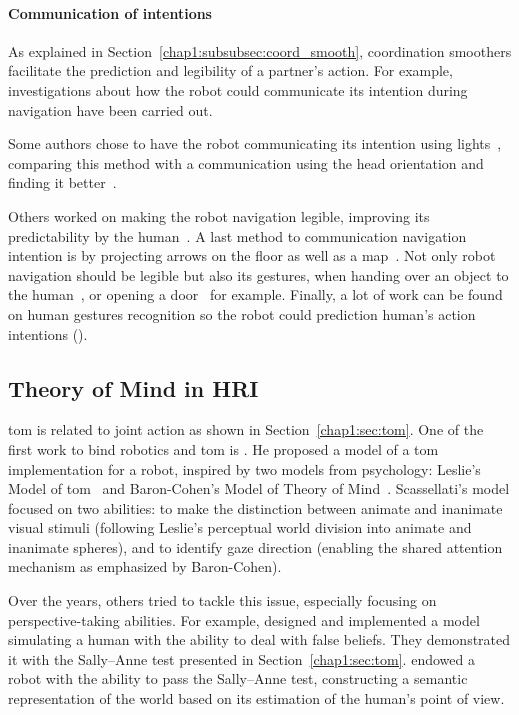 \documentclass[a4paper,11pt,twoside]{StyleThese}
\begin{document}
\paragraph{Communication of intentions} As explained in Section~\ref{chap1:subsubsec:coord_smooth}, coordination smoothers facilitate the prediction and legibility of a partner's action. For example, investigations about how the robot could communicate its intention during navigation have been carried out. 

Some authors chose to have the robot communicating its intention using lights~\citep{szafir_2015_communicating}, comparing this method with a communication using the head orientation and finding it better~\citep{may_2015_show}. 

Others worked on making the robot navigation legible, improving its predictability by the human~\citep{dragan_2013_legibility, alami_2006_toward,khambhaita_2016_head}. A last method to communication navigation intention is by projecting arrows on the floor as well as a map~\citep{chadalavada_2015_mind, coovert_2014_spatial}.  Not only robot navigation should be legible but also its gestures, when handing over an object to the human~\citep{sisbot_2012_human}, or opening a door~\citep{takayama_2011_expressing} for example. Finally, a lot of work can be found on human gestures recognition so the robot could prediction human's action intentions (\eg\citep{barros_2017_dynamic, chang_2018_effects}).

\subsection{Theory of Mind in HRI}\label{chap2:subsec:tom_hri}
\acrfull{tom} is related to joint action as shown in Section~\ref{chap1:sec:tom}. One of the first work to bind robotics and \acrshort{tom} is \cite{scassellati_2002_theory}. He proposed a model of a \acrshort{tom} implementation for a robot, inspired by two models from psychology: Leslie’s Model of \acrlong{tom}~\citep{leslie_1984_spatiotemporal} and Baron-Cohen’s Model of Theory of Mind~\citep{baron-cohen_1995_mindblindness}. Scassellati's model focused on two abilities: to make the distinction between animate and inanimate visual stimuli (following Leslie's perceptual world division into animate and inanimate spheres), and to identify gaze direction (enabling the shared attention mechanism as emphasized by Baron-Cohen). 

Over the years, others tried to tackle this issue, especially focusing on perspective-taking abilities. For example, \cite{hiatt_2010_cognitive} designed and implemented a model simulating a human with the ability to deal with false beliefs. They demonstrated it with the Sally--Anne test presented in Section~\ref{chap1:sec:tom}. \cite{milliez_2014_framework} endowed a robot with the ability to pass the Sally--Anne test, constructing a semantic representation of the world based on its estimation of the human's point of view.
\end{document}
